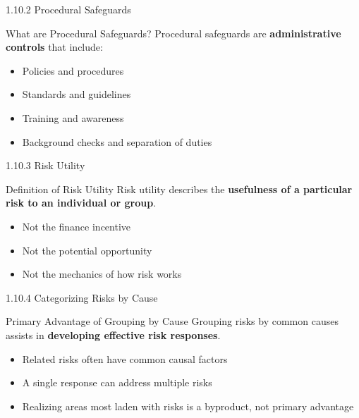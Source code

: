 \documentclass{beamer}
\begin{document}
	\begin{frame}{1.10.2 Procedural Safeguards}
		\begin{block}{What are Procedural Safeguards?}
			Procedural safeguards are \textbf{administrative controls} that include:
			\begin{itemize}
				\item Policies and procedures
				\item Standards and guidelines
				\item Training and awareness
				\item Background checks and separation of duties
			\end{itemize}
		\end{block}
	\end{frame}
	
	\begin{frame}{1.10.3 Risk Utility}
		\begin{block}{Definition of Risk Utility}
			Risk utility describes the \textbf{usefulness of a particular risk to an individual or group}.
		\end{block}
		\begin{itemize}
			\item Not the finance incentive
			\item Not the potential opportunity
			\item Not the mechanics of how risk works
		\end{itemize}
	\end{frame}
	
	\begin{frame}{1.10.4 Categorizing Risks by Cause}
		\begin{block}{Primary Advantage of Grouping by Cause}
			Grouping risks by common causes assists in \textbf{developing effective risk responses}.
		\end{block}
		\begin{itemize}
			\item Related risks often have common causal factors
			\item A single response can address multiple risks
			\item Realizing areas most laden with risks is a byproduct, not primary advantage
		\end{itemize}
	\end{frame}
	
\end{document}
